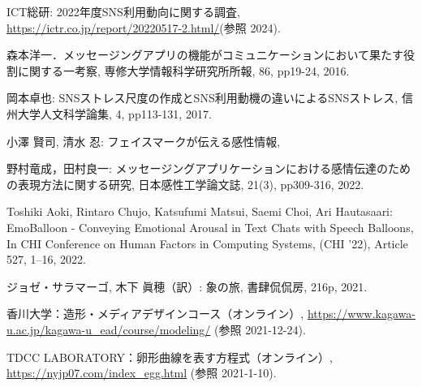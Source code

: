 \documentclass[11pt,a4paper]{ltjsreport}
\makeatletter
\renewcommand{\chapter}{%
    \if@openleft\cleardoublepage\else
    \if@openright\cleardoublepage\else\clearpage\fi\fi
    \global\@topnum\z@
    \if@english \@afterindentfalse \else \@afterindenttrue \fi
    \secdef
    {\@omit@numberfalse\@chapter}%
    {\@omit@numbertrue\@schapter}}
\makeatother
\begin{document}
\begin{thebibliography}{99} %

    ICT総研: 2022年度SNS利用動向に関する調査,
    \url{https://ictr.co.jp/report/20220517-2.html/}(参照 2024).

    森本洋一．メッセージングアプリの機能がコミュニケーションにおいて果たす役割に関する一考察,
    専修大学情報科学研究所所報, 86, pp19-24, 2016.

    岡本卓也: SNSストレス尺度の作成とSNS利用動機の違いによるSNSストレス,
    信州大学人文科学論集, 4, pp113-131, 2017.

    小澤 賢司, 清水 忍: フェイスマークが伝える感性情報,

    野村竜成，田村良一: メッセージングアプリケーションにおける感情伝達のための表現方法に関する研究,
    日本感性工学論文誌, 21(3), pp309-316, 2022.

    Toshiki Aoki, Rintaro Chujo, Katsufumi Matsui, Saemi Choi, Ari Hautasaari:
    EmoBalloon - Conveying Emotional Arousal in Text Chats with Speech Balloons,
    In CHI Conference on Human Factors in Computing Systems, (CHI '22), Article 527, 1–16, 2022.


    ジョゼ・サラマーゴ, 木下 眞穂（訳）: 象の旅, 書肆侃侃房, 216p, 2021.

    香川大学：造形・メディアデザインコース（オンライン）, \url{https://www.kagawa-u.ac.jp/kagawa-u_ead/course/modeling/} (参照 2021-12-24).

    TDCC LABORATORY：卵形曲線を表す方程式（オンライン）, \url{https://nyjp07.com/index_egg.html} (参照 2021-1-10).

\end{thebibliography}

\newpage
\appendix         %
\pagestyle{fancy}
\fancyhead{} %
\renewcommand{\chaptermark}[1]{\lhead{付録\ \thechapter\ ~~~#1}{}}
\chead{} %
\rhead{\thepage} %
\lfoot{} %
\cfoot{} %
\renewcommand{\footrulewidth}{0.5pt} %
\titleformat{\chapter}[display]{\huge\bfseries}{付録\ \thechapter}{20pt}{}[]
\end{document}
